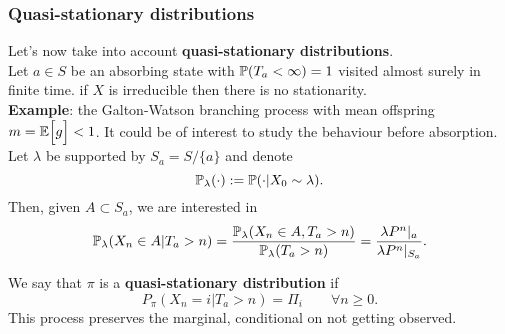 \documentclass{article}
\begin{document}
	\subsubsection{Quasi-stationary distributions}
	Let's now take into account \textbf{quasi-stationary distributions}.\\
	Let $a\in S$ be an absorbing state with $\mathbb{P}(T_a<\infty)=1$ visited almost surely in finite time. if $X$ is irreducible then there is no stationarity.\\
	\textbf{Example}: the Galton-Watson branching process with mean offspring $m=\mathbb{E}\Bigl[{g}\Bigr]<1$.
	It could be of interest to study the behaviour before absorption.\\
	Let $\lambda$ be supported by $S_a=S/\{a\}$ and denote\[\mathbb{P}_\lambda(\cdot):=\mathbb{P}(\cdot|X_0\sim\lambda).\] Then, given $A\subset S_a$, we are interested in 
	\[\mathbb{P}_\lambda(X_n\in A|T_a>n)=\frac{\mathbb{P}_\lambda(X_n\in A,T_a>n)}{\mathbb{P}_\lambda(T_a>n)}=\frac{\lambda P^n|_a}{\lambda P^n|_{S_a}}.\]
	\begin{definition}
		We say that $\pi$ is a \textbf{quasi-stationary distribution} if
		\[
		P_\pi (X_n=i|T_a>n)=\Pi_i\qquad \forall n \geqslant 0.
		\]
		This process preserves the marginal, conditional on not getting observed.
	\end{definition}
\end{document}

